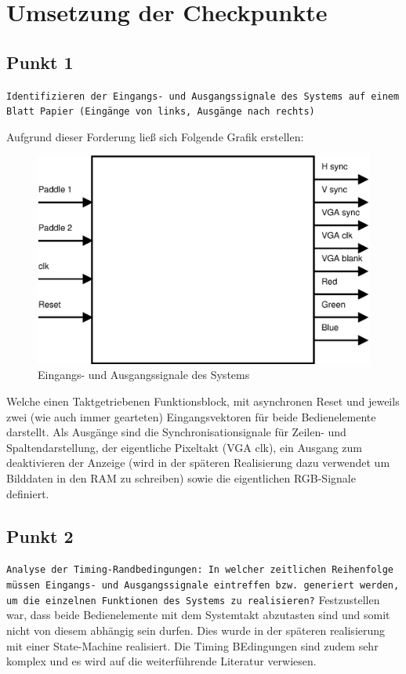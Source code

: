 \documentclass{article}
\begin{document}
\section{Umsetzung der Checkpunkte}
\subsection{Punkt 1}
\texttt{Identifizieren der Eingangs- und Ausgangssignale des Systems auf einem Blatt Papier (Eingänge von links, Ausgänge nach rechts)}

Aufgrund dieser Forderung ließ sich Folgende Grafik erstellen:
\begin{figure}[here]
	\begin{center}
		\includegraphics[width=0.65 \textwidth]{includes/TopEntity.eps}
		\caption[Eingangs- und Ausgangssignale des Systems]{Eingangs- und Ausgangssignale des Systems}
		\label{fig:Eingangs- und Ausgangssignale des Systems}
	\end{center}
\end{figure}

Welche einen Taktgetriebenen Funktionsblock, mit asynchronen Reset und jeweils zwei (wie auch immer gearteten)
Eingangsvektoren für beide Bedienelemente darstellt. Als Ausgänge sind die Synchronisationsignale für Zeilen- und Spaltendarstellung, 
der eigentliche Pixeltakt (VGA clk), ein Ausgang zum deaktivieren der Anzeige (wird in der späteren Realisierung dazu verwendet um 
Bilddaten in den RAM zu schreiben) sowie die eigentlichen RGB-Signale definiert.

\subsection{Punkt 2}
\texttt{Analyse der Timing-Randbedingungen: In welcher zeitlichen Reihenfolge müssen Eingangs- und Ausgangssignale
eintreffen bzw. generiert werden, um die einzelnen Funktionen des Systems zu realisieren?}
Festzustellen war, dass beide Bedienelemente mit dem Systemtakt abzutasten sind und somit nicht von diesem abhängig sein durfen. 
Dies wurde in der späteren realisierung mit einer State-Machine realisiert. Die Timing BEdingungen sind zudem sehr komplex und es wird
auf die weiterführende Literatur verwiesen.\cite{Hamblen}


\newpage

\listoffigures
\printindex
\end{document}
